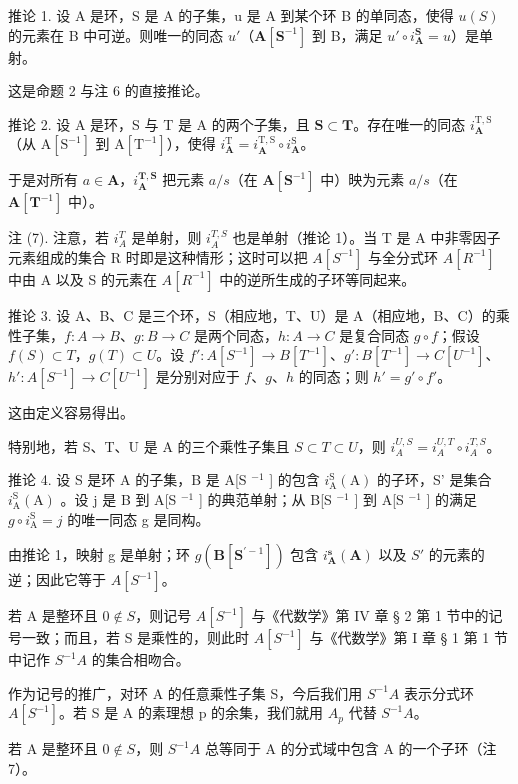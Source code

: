 推论 1. 设 A 是环，S 是 A 的子集，u 是 A 到某个环 B 的单同态，使得 \(u(S)\) 的元素在 B 中可逆。则唯一的同态 \(u'\)（\(\mathbf{A}[\mathbf{S}^{-1}]\) 到 B，满足 \(u' \circ i_{\mathbf{A}}^{\mathbf{S}} = u\)）是单射。

这是命题 2 与注 6 的直接推论。

推论 2. 设 A 是环，S 与 T 是 A 的两个子集，且 \(\mathbf{S} \subset \mathbf{T}\)。存在唯一的同态 \(i_{\mathbf{A}}^{\mathrm{T},\mathrm{S}}\)（从 \(\mathrm{A}[\mathrm{S}^{-1}]\) 到 \(\mathrm{A}[\mathrm{T}^{-1}]\)），使得 \(i_{\mathbf{A}}^{\mathrm{T}} = i_{\mathbf{A}}^{\mathrm{T},\mathrm{S}} \circ i_{\mathbf{A}}^{\mathrm{S}}\)。

于是对所有 \(a \in \mathbf{A}\)，\(i_{\mathbf{A}}^{\mathbf{T},\mathbf{S}}\) 把元素 \(a / s\)（在 \(\mathbf{A}[\mathbf{S}^{-1}]\) 中）映为元素 \(a / s\)（在 \(\mathbf{A}[\mathbf{T}^{-1}]\) 中）。

注 (7). 注意，若 \(i_{A}^{T}\) 是单射，则 \(i_{A}^{T,S}\) 也是单射（推论 1）。当 T 是 A 中非零因子元素组成的集合 R 时即是这种情形；这时可以把 \(A[S^{-1}]\) 与全分式环 \(A[R^{-1}]\) 中由 A 以及 S 的元素在 \(A[R^{-1}]\) 中的逆所生成的子环等同起来。

推论 3. 设 A、B、C 是三个环，S（相应地，T、U）是 A（相应地，B、C）的乘性子集，\(f\colon A \to B\)、\(g\colon B \to C\) 是两个同态，\(h\colon A \to C\) 是复合同态 \(g \circ f\)；假设 \(f(S) \subset T\)，\(g(T) \subset U\)。设 \(f'\colon A[S^{-1}] \to B[T^{-1}]\)、\(g'\colon B[T^{-1}] \to C[U^{-1}]\)、\(h'\colon A[S^{-1}] \to C[U^{-1}]\) 是分别对应于 \(f\)、\(g\)、\(h\) 的同态；则 \(h' = g' \circ f'\)。

这由定义容易得出。

特别地，若 S、T、U 是 A 的三个乘性子集且 \(S \subset T \subset U\)，则 \(i_{A}^{U,S} = i_{A}^{U,T} \circ i_{A}^{T,S}\)。

推论 4. 设 S 是环 A 的子集，B 是 A{[}S \(^{-1}\) {]} 的包含 \(i_{\text{A}}^{\text{S}}(\text{A})\) 的子环，S' 是集合 \(i_{\text{A}}^{\text{S}}(\text{A})\) 。设 j 是 B 到 A{[}S \(^{-1}\) {]} 的典范单射；从 B{[}S \(^{-1}\) {]} 到 A{[}S \(^{-1}\) {]} 的满足 \(g \circ i_{\text{A}}^{\text{S}} = j\) 的唯一同态 g 是同构。

由推论 1，映射 g 是单射；环 \(g(\mathbf{B}[\mathbf{S}^{\prime-1}])\) 包含 \(i_{\mathbf{A}}^{\mathbf{s}}(\mathbf{A})\) 以及 \(S'\) 的元素的逆；因此它等于 \(A[S^{-1}]\)。

若 A 是整环且 \(0 \notin S\)，则记号 \(A[S^{-1}]\) 与《代数学》第 IV 章 § 2 第 1 节中的记号一致；而且，若 S 是乘性的，则此时 \(A[S^{-1}]\) 与《代数学》第 I 章 § 1 第 1 节中记作 \(S^{-1}A\) 的集合相吻合。

作为记号的推广，对环 A 的任意乘性子集 S，今后我们用 \(S^{-1}A\) 表示分式环 \(A[S^{-1}]\)。若 S 是 A 的素理想 p 的余集，我们就用 \(A_{p}\) 代替 \(S^{-1}A\)。

若 A 是整环且 \(0 \notin S\)，则 \(S^{-1}A\) 总等同于 A 的分式域中包含 A 的一个子环（注 7）。

